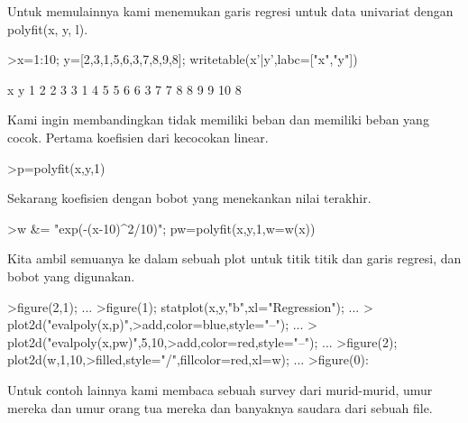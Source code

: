 \documentclass[a4paper,10pt]{article}
\begin{document}
\begin{eulernotebook}
\begin{eulercomment}
Untuk memulainnya kami menemukan garis regresi untuk data univariat
dengan polyfit(x, y, l).
\end{eulercomment}
\begin{eulerprompt}
>x=1:10; y=[2,3,1,5,6,3,7,8,9,8]; writetable(x'|y',labc=["x","y"])
\end{eulerprompt}
\begin{euleroutput}
           x         y
           1         2
           2         3
           3         1
           4         5
           5         6
           6         3
           7         7
           8         8
           9         9
          10         8
\end{euleroutput}
\begin{eulercomment}
Kami ingin membandingkan tidak memiliki beban dan memiliki beban yang
cocok. Pertama koefisien dari kecocokan linear.
\end{eulercomment}
\begin{eulerprompt}
>p=polyfit(x,y,1)
\end{eulerprompt}
\begin{euleroutput}
  [0.733333,  0.812121]
\end{euleroutput}
\begin{eulercomment}
Sekarang koefisien dengan bobot yang menekankan nilai terakhir.
\end{eulercomment}
\begin{eulerprompt}
>w &= "exp(-(x-10)^2/10)"; pw=polyfit(x,y,1,w=w(x))
\end{eulerprompt}
\begin{euleroutput}
  [4.71566,  0.38319]
\end{euleroutput}
\begin{eulercomment}
Kita ambil semuanya ke dalam sebuah plot untuk titik titik dan garis
regresi, dan bobot yang digunakan.
\end{eulercomment}
\begin{eulerprompt}
>figure(2,1);  ...
>figure(1); statplot(x,y,"b",xl="Regression"); ...
>  plot2d("evalpoly(x,p)",>add,color=blue,style="--"); ...
>  plot2d("evalpoly(x,pw)",5,10,>add,color=red,style="--"); ...
>figure(2); plot2d(w,1,10,>filled,style="/",fillcolor=red,xl=w); ...
>figure(0):
\end{eulerprompt}
\begin{eulercomment}
Untuk contoh lainnya kami membaca sebuah survey dari murid-murid, umur
mereka dan umur orang tua mereka dan banyaknya saudara dari sebuah
file.


\end{eulercomment}
\end{eulernotebook}
\end{document}

